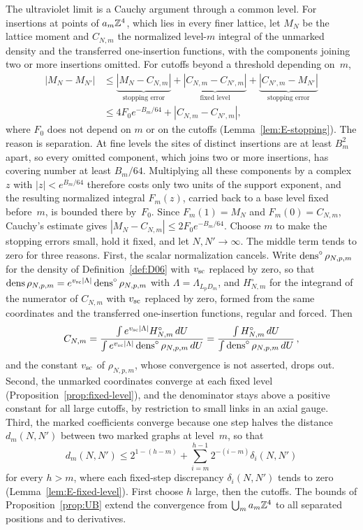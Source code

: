 The ultraviolet limit is a Cauchy argument through a common level. For insertions at points of $a_m\mathbb{Z}^4$, which lies in every finer lattice, let $M_N$ be the lattice moment and $C_{N,m}$ the normalized level-$m$ integral of the unmarked density and the transferred one-insertion functions, with the components joining two or more insertions omitted. For cutoffs beyond a threshold depending on~$m$,
\begin{align*}
|M_N-M_{N'}|&\le
\underbrace{|M_N-C_{N,m}|}_{\text{stopping error}}
+\underbrace{|C_{N,m}-C_{N',m}|}_{\text{fixed level}}
+\underbrace{|C_{N',m}-M_{N'}|}_{\text{stopping error}}\\
&\le4F_0e^{-B_m/64}+|C_{N,m}-C_{N',m}|,
\end{align*}
where $F_0$ does not depend on $m$ or on the cutoffs (Lemma~\ref{lem:E-stopping}). The reason is separation. At fine levels the sites of distinct insertions are at least $B_m^2$ apart, so every omitted component, which joins two or more insertions, has covering number at least $B_m/64$. Multiplying all these components by a complex~$z$ with $|z|<e^{B_m/64}$ therefore costs only two units of the support exponent, and the resulting normalized integral $F_m(z)$, carried back to a base level fixed before~$m$, is bounded there by~$F_0$. Since $F_m(1)=M_N$ and $F_m(0)=C_{N,m}$, Cauchy's estimate gives $|M_N-C_{N,m}|\le2F_0e^{-B_m/64}$. Choose $m$ to make the stopping errors small, hold it fixed, and let $N,N'\to\infty$. The middle term tends to zero for three reasons. First, the scalar normalization cancels. Write $\operatorname{dens}^\circ\rho_{N,p,m}$ for the density of Definition~\ref{def:D06} with $v_{\rm sc}$ replaced by zero, so that $\operatorname{dens}\rho_{N,p,m}=e^{v_{\rm sc}|\Lambda|}\operatorname{dens}^\circ\rho_{N,p,m}$ with $\Lambda=\Lambda_{L_pD_m}$, and $H^\circ_{N,m}$ for the integrand of the numerator of $C_{N,m}$ with $v_{\rm sc}$ replaced by zero, formed from the same coordinates and the transferred one-insertion functions, regular and forced. Then
\begin{equation*}
C_{N,m}=\frac{\int e^{v_{\rm sc}|\Lambda|}H^\circ_{N,m}\,dU}{\int e^{v_{\rm sc}|\Lambda|}\operatorname{dens}^\circ\rho_{N,p,m}\,dU}
=\frac{\int H^\circ_{N,m}\,dU}{\int\operatorname{dens}^\circ\rho_{N,p,m}\,dU}\,,
\end{equation*}
and the constant $v_{\rm sc}$ of $\rho_{N,p,m}$, whose convergence is not asserted, drops out. Second, the unmarked coordinates converge at each fixed level (Proposition~\ref{prop:fixed-level}), and the denominator stays above a positive constant for all large cutoffs, by restriction to small links in an axial gauge. Third, the marked coefficients converge because one step halves the distance $d_m(N,N')$ between two marked graphs at level~$m$, so that
\begin{equation*}
d_m(N,N')\le2^{1-(h-m)}+\sum_{i=m}^{h-1}2^{-(i-m)}\delta_i(N,N')
\end{equation*}
for every $h>m$, where each fixed-step discrepancy $\delta_i(N,N')$ tends to zero (Lemma~\ref{lem:E-fixed-level}). First choose $h$ large, then the cutoffs. The bounds of Proposition~\ref{prop:UB} extend the convergence from $\bigcup_ma_m\mathbb{Z}^4$ to all separated positions and to derivatives.

